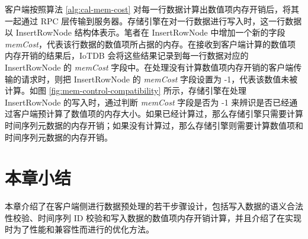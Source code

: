 客户端按照算法 \ref{alg:cal-mem-cost} 对每一行数据计算出数值项内存开销后，将其一起通过 RPC 层传输到服务器。存储引擎在对一行数据进行写入时，这一行数据以 InsertRowNode 结构体表示。笔者在 InsertRowNode 中增加一个新的字段 \emph{memCost}，代表该行数据的数值项所占据的内存。在接收到客户端计算的数值项内存开销的结果后，IoTDB 会将这些结果记录到每一行数据对应的 InsertRowNode 的 \emph{memCost} 字段中。在处理没有计算数值项内存开销的客户端传输的请求时，则把 InsertRowNode 的 \emph{memCost} 字段设置为 -1，代表该数值未被计算。如图 \ref{fig:mem-control-compatibility} 所示，存储引擎在处理 InsertRowNode 的写入时，通过判断 \emph{memCost} 字段是否为 -1 来辨识是否已经通过客户端预计算了数值项的内存大小。如果已经计算过，那么存储引擎只需要计算时间序列元数据的内存开销；如果没有计算过，那么存储引擎则需要计算数值项和时间序列元数据的内存开销。

\section{本章小结}
本章介绍了在客户端侧进行数据预处理的若干步骤设计，包括写入数据的语义合法性校验、时间序列 ID 校验和写入数据的数值项内存开销计算，并且介绍了在实现时为了性能和兼容性而进行的优化方法。
